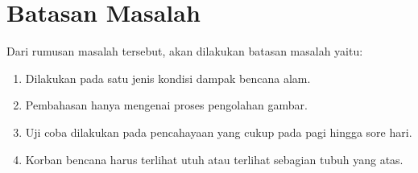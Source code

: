 \section{Batasan Masalah}  %

Dari rumusan masalah tersebut, akan dilakukan batasan masalah yaitu:
\begin{enumerate}
 \item Dilakukan pada satu jenis kondisi dampak bencana alam.
 \item Pembahasan hanya mengenai proses pengolahan gambar.
 \item Uji coba dilakukan pada pencahayaan yang cukup pada pagi hingga sore hari.
 \item Korban bencana harus terlihat utuh atau terlihat sebagian tubuh yang atas.
\end{enumerate}


